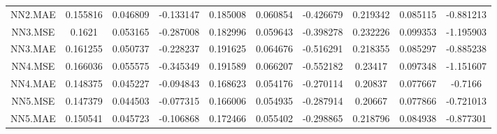 \begin{longtable}[t]{cccccccccc}
NN2.MAE & 0.155816 & 0.046809 & -0.133147 & 0.185008 & 0.060854 & -0.426679 & 0.219342 & 0.085115 & -0.881213\\
\addlinespace
NN3.MSE & 0.1621 & 0.053165 & -0.287008 & 0.182996 & 0.059643 & -0.398278 & 0.232226 & 0.099353 & -1.195903\\
NN3.MAE & 0.161255 & 0.050737 & -0.228237 & 0.191625 & 0.064676 & -0.516291 & 0.218355 & 0.085297 & -0.885238\\
NN4.MSE & 0.166036 & 0.055575 & -0.345349 & 0.191589 & 0.066207 & -0.552182 & 0.23417 & 0.097348 & -1.151607\\
NN4.MAE & 0.148375 & 0.045227 & -0.094843 & 0.168623 & 0.054176 & -0.270114 & 0.20837 & 0.077667 & -0.7166\\
NN5.MSE & 0.147379 & 0.044503 & -0.077315 & 0.166006 & 0.054935 & -0.287914 & 0.20667 & 0.077866 & -0.721013\\
\addlinespace
NN5.MAE & 0.150541 & 0.045723 & -0.106868 & 0.172466 & 0.055402 & -0.298865 & 0.218796 & 0.084938 & -0.877301\\*
\end{longtable}
\endgroup{}